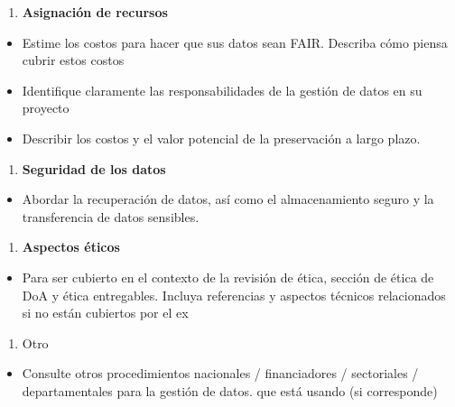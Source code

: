 \documentclass[
  14pt,
]{book}
\providecommand{\tightlist}{%
  \setlength{\itemsep}{0pt}\setlength{\parskip}{0pt}}
\begin{document}
\begin{enumerate}
\def\labelenumi{\arabic{enumi}.}
\setcounter{enumi}{2}
\tightlist
\item
  \textbf{Asignación de recursos}
\end{enumerate}

\begin{itemize}
\tightlist
\item
  Estime los costos para hacer que sus datos sean FAIR. Describa cómo piensa cubrir estos
  costos
\item
  Identifique claramente las responsabilidades de la gestión de datos en su proyecto
\item
  Describir los costos y el valor potencial de la preservación a largo plazo.
\end{itemize}

\begin{enumerate}
\def\labelenumi{\arabic{enumi}.}
\setcounter{enumi}{3}
\tightlist
\item
  \textbf{Seguridad de los datos}
\end{enumerate}

\begin{itemize}
\tightlist
\item
  Abordar la recuperación de datos, así como el almacenamiento seguro y la transferencia de datos sensibles.
\end{itemize}

\begin{enumerate}
\def\labelenumi{\arabic{enumi}.}
\setcounter{enumi}{4}
\tightlist
\item
  \textbf{Aspectos éticos}
\end{enumerate}

\begin{itemize}
\tightlist
\item
  Para ser cubierto en el contexto de la revisión de ética, sección de ética de DoA y ética
  entregables. Incluya referencias y aspectos técnicos relacionados si no están cubiertos por el
  ex
\end{itemize}

\begin{enumerate}
\def\labelenumi{\arabic{enumi}.}
\setcounter{enumi}{5}
\tightlist
\item
  Otro
\end{enumerate}

\begin{itemize}
\tightlist
\item
  Consulte otros procedimientos nacionales / financiadores / sectoriales / departamentales para la gestión de datos.
  que está usando (si corresponde)
\end{itemize}
\end{document}
